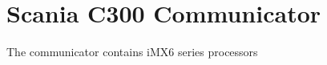 \chapter{Scania C300 Communicator} \label{rtc-c300}

The communicator contains iMX6 series processors
